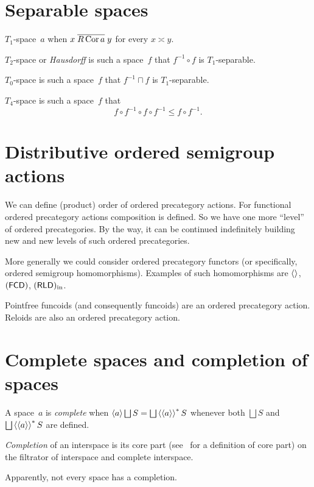 \chapter{Separable spaces}

$T_1$-space~$a$ when $x\mathrel{\overline{R\operatorname{Cor} a}}y$ for every $x\asymp y$.

$T_2$-space or \emph{Hausdorff} is such a space~$f$ that $f^{-1}\circ f$ is $T_1$-separable.

$T_0$-space is such a space~$f$ that $f^{-1}\sqcap f$ is $T_1$-separable.

$T_4$-space is such a space~$f$ that \[ f\circ f^{-1}\circ f\circ f^{-1}\leq f\circ f^{-1}. \]

\chapter{Distributive ordered semigroup actions}

We can define (product) order of ordered precategory actions. For functional ordered precategory actions composition is defined. So we have one more ``level'' of ordered precategories. By the way, it can be continued indefinitely building new and new levels of such ordered precategories.

More generally we could consider ordered precategory functors (or specifically, ordered semigroup homomorphisms). Examples of such homomorphisms are $\left\langle \right\rangle$, $(\mathsf{FCD})$, $(\mathsf{RLD})_{\mathrm{in}}$.

Pointfree funcoids (and consequently funcoids) are an ordered precategory action. Reloids are also an ordered precategory action.

\chapter{Complete spaces and completion of spaces}

A space~$a$ is \emph{complete} when $\supfun{a}\bigsqcup S=\bigsqcup\rsupfun{\supfun{a}}S$ whenever both $\bigsqcup S$ and $\bigsqcup\rsupfun{\supfun{a}}S$ are defined.

\begin{defn}
\emph{Completion} of an interspace is its core part (see~\cite{volume-1} for a definition of core part) on the filtrator of interspace and complete interspace.
\end{defn}

\begin{note}
Apparently, not every space has a completion.
\end{note}

